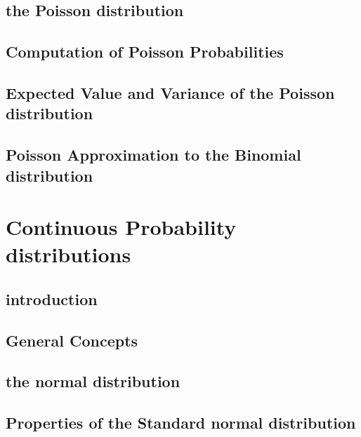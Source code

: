 \documentclass[12pt,]{article}
\theoremstyle{definition}
\theoremstyle{definition}
\theoremstyle{definition}
\theoremstyle{remark}
\begin{document}
\subsection{the Poisson distribution}\label{the-poisson-distribution}

\subsection{Computation of Poisson
Probabilities}\label{computation-of-poisson-probabilities}

\subsection{Expected Value and Variance of the Poisson
distribution}\label{expected-value-and-variance-of-the-poisson-distribution}

\subsection{Poisson Approximation to the Binomial
distribution}\label{poisson-approximation-to-the-binomial-distribution}

\section{Continuous Probability
distributions}\label{continuous-probability-distributions}

\subsection{introduction}\label{introduction-3}

\subsection{General Concepts}\label{general-concepts}

\subsection{the normal distribution}\label{the-normal-distribution}

\subsection{Properties of the Standard normal
distribution}\label{properties-of-the-standard-normal-distribution}
\end{document}
